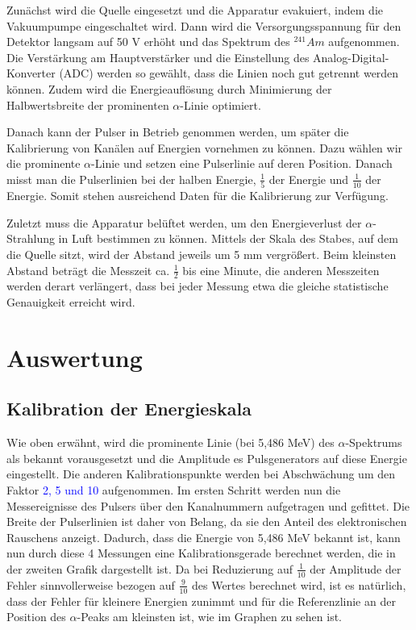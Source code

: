 \documentclass[bigchapter,colorback,accentcolor=tud4b,linedtoc,11pt]{tudreport}
\begin{document}
Zunächst wird die Quelle eingesetzt und die Apparatur evakuiert, indem die Vakuumpumpe eingeschaltet wird. Dann wird die Versorgungsspannung für den Detektor langsam auf 50 V erhöht und das Spektrum des $^{241}Am$ aufgenommen. Die Verstärkung am Hauptverstärker und die Einstellung des Analog-Digital-Konverter (ADC) werden so gewählt, dass die Linien noch gut getrennt werden können. Zudem wird die Energieauflösung durch Minimierung der Halbwertsbreite der prominenten $\alpha$-Linie optimiert. 

Danach kann der Pulser in Betrieb genommen werden, um später die Kalibrierung von Kanälen auf Energien vornehmen zu können. Dazu wählen wir die prominente $\alpha$-Linie und setzen eine Pulserlinie auf deren Position. Danach misst man die Pulserlinien bei der halben Energie, $\frac{1}{5}$ der Energie und $\frac{1}{10}$ der Energie. Somit stehen ausreichend Daten für die Kalibrierung zur Verfügung. 

Zuletzt muss die Apparatur belüftet werden, um den Energieverlust der $\alpha$-Strahlung in Luft bestimmen zu können. Mittels der Skala des Stabes, auf dem die Quelle sitzt, wird der Abstand jeweils um 5 mm vergrößert. Beim kleinsten Abstand beträgt die Messzeit ca. $\frac{1}{2}$ bis eine Minute, die anderen Messzeiten werden derart verlängert, dass bei jeder Messung etwa die gleiche statistische Genauigkeit erreicht wird. 

\chapter{Auswertung}

\section{Kalibration der Energieskala}

Wie oben erwähnt, wird die prominente Linie (bei 5,486 MeV) des
$\alpha$-Spektrums als bekannt vorausgesetzt und die Amplitude es Pulsgenerators
auf diese Energie eingestellt. Die anderen Kalibrationspunkte werden bei
Abschwächung um den Faktor \textcolor{blue}{2, 5 und 10} aufgenommen. Im ersten Schritt werden nun die
Messereignisse des Pulsers über den Kanalnummern aufgetragen und gefittet. Die
Breite der Pulserlinien ist daher von Belang, da sie den Anteil des
elektronischen Rauschens anzeigt. Dadurch, dass die Energie von 5,486 MeV
bekannt ist, kann nun durch diese 4 Messungen eine Kalibrationsgerade berechnet
werden, die in der zweiten Grafik dargestellt ist. Da bei Reduzierung auf
$\frac{1}{10}$ der Amplitude der Fehler sinnvollerweise bezogen auf
$\frac{9}{10}$ des Wertes berechnet wird, ist es natürlich, dass der Fehler für
kleinere Energien zunimmt und für die Referenzlinie an der Position des $\alpha$-Peaks am kleinsten ist, wie im Graphen zu sehen ist. 
\end{document}
